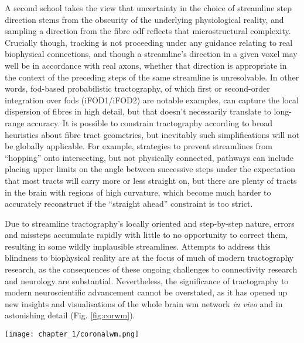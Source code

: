 \documentclass[12pt,phd,a4paper,twoside]{ucl_thesis}
\begin{document}
A second school takes the view that uncertainty in the choice of streamline step direction stems from the obscurity of the underlying physiological reality, and sampling a direction from the fibre \gls{odf} reflects that microstructural complexity.
Crucially though, tracking is not proceeding under any guidance relating to real biophysical connections, and though a streamline's direction in a given voxel may well be in accordance with real axons, whether that direction is appropriate in the context of the preceding steps of the same streamline is unresolvable.
In other words, \gls{fod}-based probabilistic tractography, of which first or second-order integration over \glspl{fod}  (iFOD1/iFOD2)\autocite{Tournier2012,Tournier2010} are notable examples, can capture the local dispersion of fibres in high detail, but that doesn't necessarily translate to long-range accuracy.
It is possible to constrain tractography according to broad heuristics about fibre tract geometries, but inevitably such simplifications will not be globally applicable.
For example, strategies to prevent streamlines from ``hopping'' onto intersecting, but not physically connected, pathways can include placing upper limits on the angle between successive steps under the expectation that most tracts will carry more or less straight on, but there are plenty of tracts in the brain with regions of high curvature, which become much harder to accurately reconstruct if the ``straight ahead'' constraint is too strict.

Due to streamline tractography's locally oriented and step-by-step nature, errors and missteps accumulate rapidly with little to no opportunity to correct them, resulting in some wildly implausible streamlines.
Attempts to address this blindness to biophysical reality are at the focus of much of modern tractography research\autocite{Bastiani2017,Rheault2019,Aydogan2021}, as the consequences of these ongoing challenges to connectivity research and neurology are substantial\autocite{Schilling2019, Yang2021, Grisot2021}.
Nevertheless, the significance of tractography to modern neuroscientific advancement cannot be overstated, as it has opened up new insights and visualisations of the whole brain \gls{wm} network \textit{in vivo} and in astonishing detail (Fig. \ref{fig:corwm}).

\begin{SCfigure}
  \texttt{[image: chapter\_1/coronalwm.png]}
  \caption[dMRI white matter imaging and tractography]{Coronal section of the author's white matter, imaged with   mapping and streamline tractography. The  are visible radiating from the cortex to converge in the internal capsules before descending through the anterior pons, perpendicular to the middle cerebellar peduncle fibres. Either side of the pons, the trigeminal nerves (cranial nerve V) are visible as small green dots.}
  \label{fig:corwm}
\end{SCfigure}
\end{document}
